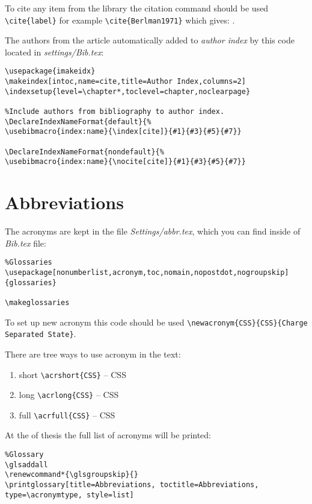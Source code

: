 To cite any item from the library the citation command should be used \lstinline|\cite{label}| for example \lstinline|\cite{Berlman1971}| which gives: \cite{Berlman1971}.

The authors from the article automatically added to \textit{author index} by this code located in \textit{settings/Bib.tex}:

\begin{lstlisting}
\usepackage{imakeidx}
\makeindex[intoc,name=cite,title=Author Index,columns=2]
\indexsetup{level=\chapter*,toclevel=chapter,noclearpage}

%Include authors from bibliography to author index.
\DeclareIndexNameFormat{default}{%
\usebibmacro{index:name}{\index[cite]}{#1}{#3}{#5}{#7}}

\DeclareIndexNameFormat{nondefault}{%
\usebibmacro{index:name}{\nocite[cite]}{#1}{#3}{#5}{#7}}  
\end{lstlisting}



\section{Abbreviations}
The acronyms are kept in the file \textit{Settings/abbr.tex}, which you can find  inside of \textit{Bib.tex} file:

\begin{lstlisting}
%Glossaries
\usepackage[nonumberlist,acronym,toc,nomain,nopostdot,nogroupskip]{glossaries}

\makeglossaries
\end{lstlisting}

To set up new acronym this code should be used \lstinline|\newacronym{CSS}{CSS}{Charge Separated State}|.

There are tree ways to use acronym in the text:
\begin{enumerate}
	\item short \lstinline|\acrshort{CSS}| -- \acrshort{CSS}
	\item long  \lstinline|\acrlong{CSS}| -- \acrlong{CSS}
	\item full \lstinline|\acrfull{CSS}| -- \acrfull{CSS}
\end{enumerate}
  
At the of thesis the full list of acronyms will be printed:
\begin{lstlisting}
%Glossary
\glsaddall
\renewcommand*{\glsgroupskip}{}
\printglossary[title=Abbreviations, toctitle=Abbreviations, type=\acronymtype, style=list]
\end{lstlisting}

